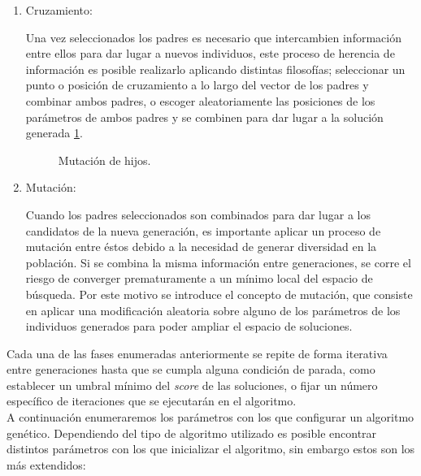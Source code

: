 \begin{enumerate}
                \item Cruzamiento:

                        Una vez seleccionados los padres es necesario que intercambien información entre ellos para dar lugar a nuevos individuos, este proceso de herencia de información es posible realizarlo aplicando distintas filosofías; seleccionar un punto o posición de cruzamiento a lo largo del vector de los padres y combinar ambos padres, o escoger aleatoriamente las posiciones de los parámetros de ambos padres y se combinen para dar lugar a la solución generada \ref{ParentsMatingMutationImage}.

                        \begin{figure}[h]
                            \centering
                            
                            \caption{Mutación de hijos.}
                            \label{ParentsMatingMutationImage}
                        \end{figure}

                \item Mutación:

                        Cuando los padres seleccionados son combinados para dar lugar a los candidatos de la nueva generación, es importante aplicar un proceso de mutación entre éstos debido a la necesidad de generar diversidad en la población. Si se combina la misma información entre generaciones, se corre el riesgo de converger prematuramente a un mínimo local del espacio de búsqueda. Por este motivo se introduce el concepto de mutación, que consiste en aplicar una modificación aleatoria sobre alguno de los parámetros de los individuos generados para poder ampliar el espacio de soluciones. 
            \end{enumerate}

            Cada una de las fases enumeradas anteriormente se repite de forma iterativa entre generaciones hasta que se cumpla alguna condición de parada, como establecer un umbral mínimo del \textit{score} de las soluciones, o fijar un número específico de iteraciones que se ejecutarán en el algoritmo.\\


            A continuación enumeraremos los parámetros con los que configurar un algoritmo genético. Dependiendo del tipo de algoritmo utilizado es posible encontrar distintos parámetros con los que inicializar el algoritmo, sin embargo estos son los más extendidos:


